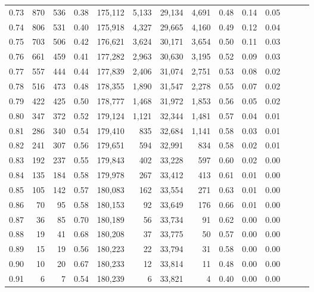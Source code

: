 \begin{tabular}{rrrrrrrrrrrrrr}
0.73 &    870 &    536 &  0.38 &  175,112 &    5,133 &  29,134 &   4,691 &  0.48 &  0.14 &      0.05 \\
0.74 &    806 &    531 &  0.40 &  175,918 &    4,327 &  29,665 &   4,160 &  0.49 &  0.12 &      0.04 \\
0.75 &    703 &    506 &  0.42 &  176,621 &    3,624 &  30,171 &   3,654 &  0.50 &  0.11 &      0.03 \\
0.76 &    661 &    459 &  0.41 &  177,282 &    2,963 &  30,630 &   3,195 &  0.52 &  0.09 &      0.03 \\
0.77 &    557 &    444 &  0.44 &  177,839 &    2,406 &  31,074 &   2,751 &  0.53 &  0.08 &      0.02 \\
0.78 &    516 &    473 &  0.48 &  178,355 &    1,890 &  31,547 &   2,278 &  0.55 &  0.07 &      0.02 \\
0.79 &    422 &    425 &  0.50 &  178,777 &    1,468 &  31,972 &   1,853 &  0.56 &  0.05 &      0.02 \\
0.80 &    347 &    372 &  0.52 &  179,124 &    1,121 &  32,344 &   1,481 &  0.57 &  0.04 &      0.01 \\
0.81 &    286 &    340 &  0.54 &  179,410 &      835 &  32,684 &   1,141 &  0.58 &  0.03 &      0.01 \\
0.82 &    241 &    307 &  0.56 &  179,651 &      594 &  32,991 &     834 &  0.58 &  0.02 &      0.01 \\
0.83 &    192 &    237 &  0.55 &  179,843 &      402 &  33,228 &     597 &  0.60 &  0.02 &      0.00 \\
0.84 &    135 &    184 &  0.58 &  179,978 &      267 &  33,412 &     413 &  0.61 &  0.01 &      0.00 \\
0.85 &    105 &    142 &  0.57 &  180,083 &      162 &  33,554 &     271 &  0.63 &  0.01 &      0.00 \\
0.86 &     70 &     95 &  0.58 &  180,153 &       92 &  33,649 &     176 &  0.66 &  0.01 &      0.00 \\
0.87 &     36 &     85 &  0.70 &  180,189 &       56 &  33,734 &      91 &  0.62 &  0.00 &      0.00 \\
0.88 &     19 &     41 &  0.68 &  180,208 &       37 &  33,775 &      50 &  0.57 &  0.00 &      0.00 \\
0.89 &     15 &     19 &  0.56 &  180,223 &       22 &  33,794 &      31 &  0.58 &  0.00 &      0.00 \\
0.90 &     10 &     20 &  0.67 &  180,233 &       12 &  33,814 &      11 &  0.48 &  0.00 &      0.00 \\
0.91 &      6 &      7 &  0.54 &  180,239 &        6 &  33,821 &       4 &  0.40 &  0.00 &      0.00 \\

\end{tabular}
